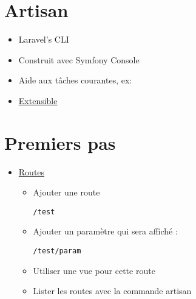 \hypertarget{artisan}{%
\section{Artisan}\label{artisan}}

\begin{itemize}
\tightlist
\item
  Laravel's CLI
\item
  Construit avec Symfony Console
\item
  Aide aux tâches courantes, ex:
\end{itemize}

\begin{otherlanguage}{english}

\begin{Shaded}
\begin{Highlighting}[]
 
 
 

 
\end{Highlighting}
\end{Shaded}

\end{otherlanguage}

\begin{itemize}
\tightlist
\item
  \href{https://laravel.com/docs/master/artisan}{Extensible}
\end{itemize}

\hypertarget{premiers-pas}{%
\section{Premiers pas}\label{premiers-pas}}

\begin{itemize}
\tightlist
\item
  \href{https://laravel.com/docs/master/routing}{Routes}

  \begin{itemize}
  \tightlist
  \item
    Ajouter une route
    \begin{otherlanguage}{english}\texttt{/test}\end{otherlanguage}
  \item
    Ajouter un paramètre qui sera affiché :
    \begin{otherlanguage}{english}\texttt{/test/param}\end{otherlanguage}
  \item
    Utiliser une vue pour cette route
  \item
    Lister les routes avec la commande artisan
  \end{itemize}
\end{itemize}

